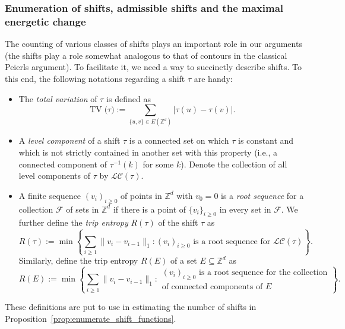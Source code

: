 \documentclass[11pt, reqno]{amsart}
\newcommand{\Z}{\mathbb{Z}}
\DeclareMathOperator{\TV}{TV}
\numberwithin{equation}{section}
\begin{document}
\subsubsection{Enumeration of shifts, admissible shifts and the maximal energetic change}\label{sec:admissible shifts}

The counting of various classes of shifts plays an important role in our arguments (the shifts play a role somewhat analogous to that of contours in the classical Peierls argument). To facilitate it, we need a way to succinctly describe shifts. To this end, the following notations regarding a shift $\tau$ are handy:
\begin{itemize}
\item 
The \emph{total variation} of $\tau$ is defined as 
\begin{equation*}
\TV{(\tau}):= 
\sum_{\{u,v\}\in E(\Z^d)} \lvert \tau(u)-\tau(v) \rvert.
\end{equation*}
\item   
A \emph{level component} of a shift $\tau$ is a connected set on which $\tau$ is constant and which is not strictly contained in another set with this property (i.e., a connected component of $\tau^{-1}(k)$ for some $k$).
Denote the collection of all level components of $\tau$ by $\mathcal{LC}(\tau)$.
\item 
A finite sequence $(v_i)_{i\ge 0}$ of points in $\Z^d$ with $v_0 = 0$ is a \emph{root sequence} for a collection $\mathcal F$ of sets in ${\mathbb Z}^d$ if there is a point of $\{v_i\}_{i\geq 0}$ in every set in $\mathcal F$. We further define the \emph{trip entropy} $R(\tau)$ of the shift $\tau$ as
\begin{equation*}
R(\tau):=\min\left\{\sum_{i\ge 1} \|v_i - v_{i-1}\|_1\colon (v_i)_{i\geq 0}\text{ is a root sequence for } \mathcal{LC}(\tau)\right\}.
\end{equation*}
Similarly, define the trip entropy $R(E)$ of a set $E\subseteq{\mathbb Z}^d$ as
\begin{equation*}
R(E):=\min\left\{\sum_{i\ge 1} \|v_i - v_{i-1}\|_1\colon \substack{(v_i)_{i\geq 0}\text{ is a root sequence for the collection} \\  \text{of connected components of } E}\right\}.
\end{equation*}   
\end{itemize}
These definitions are put to use in estimating the number of shifts in Proposition~\ref{prop:enumerate_shift_functions}.
\end{document}
